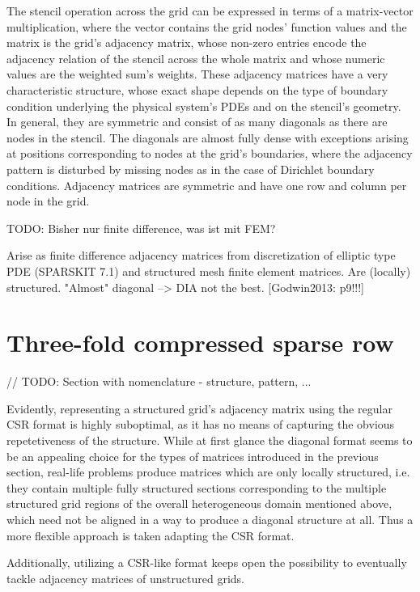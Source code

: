 \documentclass{article}
\begin{document}
    The stencil operation across the grid can be expressed in terms of a matrix-vector multiplication, where
    the vector contains the grid nodes' function values and the matrix is the grid's adjacency matrix, whose non-zero
    entries encode the adjacency relation of the stencil across the whole matrix and whose numeric values are the
    weighted sum's weights. These adjacency matrices have a very characteristic structure, whose exact shape depends on
    the type of boundary condition underlying the physical system's PDEs and on the stencil's geometry. In general, they
    are symmetric and consist of as many diagonals as there are nodes in the stencil. The diagonals are almost fully
    dense with exceptions arising at positions corresponding to nodes at the grid's boundaries, where the
    adjacency pattern is disturbed by missing nodes as in the case of Dirichlet boundary conditions. Adjacency matrices
    are symmetric and have one row and column per node in the grid.

    

    TODO: Bisher nur finite difference, was ist mit FEM?

    Arise as finite difference adjacency matrices from discretization of elliptic type PDE (SPARSKIT 7.1)
      and structured mesh finite element matrices.
    Are (locally) structured.
    "Almost" diagonal --> DIA not the best. [Godwin2013: p9!!!]

\section{Three-fold compressed sparse row}

// TODO: Section with nomenclature
  - structure, pattern, ...

  Evidently, representing a structured grid's adjacency matrix using the regular CSR format is highly suboptimal, as it
  has no means of capturing the obvious repetetiveness of the structure. While at first glance the diagonal format seems
  to be an appealing choice for the types of matrices introduced in the previous section, real-life problems produce
  matrices which are only locally structured, i.e. they contain multiple fully structured sections corresponding to the
  multiple structured grid regions of the overall heterogeneous domain mentioned above, which need not be aligned in
  a way to produce a diagonal structure at all. Thus a more flexible approach is taken adapting the CSR format.

  Additionally, utilizing a CSR-like format keeps open the possibility to eventually tackle adjacency matrices of
  unstructured grids.
\end{document}
